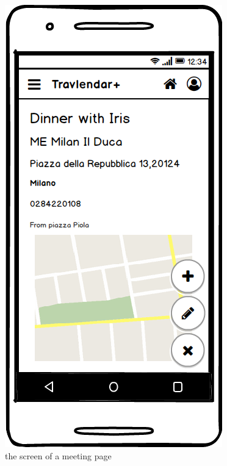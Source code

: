 \documentclass[11pt]{article}
\begin{document}
	\begin{figure}
		\centering
		\includegraphics[width=0.7\linewidth]{MeetingView.png}
		\caption{the screen of a meeting page}
		\label{fig:meeting-view}
	\end{figure}
	
\end{document}
